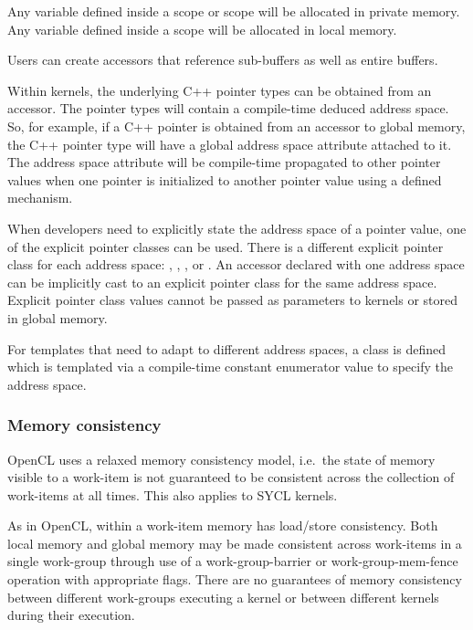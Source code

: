 Any variable defined inside a  scope or
 scope will be allocated in private
memory. Any variable defined inside a 
scope will be allocated in local memory.

Users can create accessors that reference sub-buffers as well as entire buffers.

Within kernels, the underlying C++ pointer types can be obtained from an
accessor. The pointer types will contain a compile-time deduced address space.
So, for example, if a C++ pointer is obtained from an accessor to global memory, 
the C++ pointer type will have a global address space attribute attached to it. 
The address space attribute will be compile-time propagated to other pointer
values when one pointer is initialized to another pointer value using a defined
mechanism.

When developers need to explicitly state the address space of a pointer value,
one of the explicit pointer classes can be used. There is a different explicit
pointer class for each address space: ,
, ,
or . An accessor declared with one
address space can be implicitly cast to an explicit pointer class
for the same address space. Explicit pointer class values cannot be passed
as parameters to kernels or stored in global memory.


For templates that need to adapt to different address spaces, a
 class is defined which is templated
via a compile-time constant enumerator value to specify the address space.

\subsubsection{Memory consistency}

OpenCL uses a relaxed memory consistency model, i.e.\ the state of
memory visible to a work-item is not guaranteed to be consistent
across the collection of work-items at all times. This also applies to
SYCL kernels.

As in OpenCL, within a work-item memory has load/store consistency. Both local
memory and global memory may be made consistent across work-items in a single
work-group through use of a \gls{work-group-barrier} or \gls{work-group-mem-fence} operation with appropriate flags. There are no guarantees of memory consistency between different work-groups executing a kernel or between different kernels during their execution.

